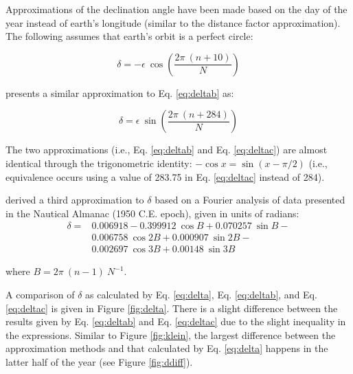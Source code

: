 Approximations of the declination angle have been made based on the day of the year instead of earth's longitude (similar to the distance factor approximation). 
The following assumes that earth's orbit is a perfect circle:

\begin{equation}
\label{eq:deltab}
    \delta = -\epsilon\:\cos\left(\frac{2\pi\:(n+10)}{N} \right)
\end{equation}

\cite{cooper69} presents a similar approximation to Eq. \ref{eq:deltab} as:

\begin{equation}
\label{eq:deltac}
    \delta = \epsilon\:\sin\left(\frac{2\pi\:(n + 284)}{N} \right)
\end{equation}

The two approximations (i.e., Eq. \ref{eq:deltab} and Eq. \ref{eq:deltac}) are almost identical through the trigonometric identity: $-\cos x = \sin(x - \pi/2)$ (i.e., equivalence occurs using a value of 283.75 in Eq. \ref{eq:deltac} instead of 284).

\cite{spencer71} derived a third approximation to $\delta$ based on a Fourier analysis of data presented in the Nautical Almanac (1950 C.E. epoch), given in units of radians:
\begin{equation}
\label{eq:spencer}
\begin{split}
	\delta = & 0.006918 - 0.399912\:\cos B + 0.070257\:\sin B - \\
             & 0.006758 \:\cos 2B + 0.000907\:\sin 2B - \\
             & 0.002697\:\cos 3B + 0.00148 \:\sin 3B
\end{split}
\end{equation} 

\noindent where $B = 2\pi\:\left(n-1\right)\: N^{-1}$.

A comparison of $\delta$ as calculated by Eq. \ref{eq:delta}, Eq. \ref{eq:deltab}, and Eq. \ref{eq:deltac} is given in Figure \ref{fig:delta}. 
There is a slight difference between the results given by Eq. \ref{eq:deltab} and Eq. \ref{eq:deltac} due to the slight inequality in the expressions. 
Similar to Figure \ref{fig:klein}, the largest difference between the approximation methods and that calculated by Eq. \ref{eq:delta} happens in the latter half of the year (see Figure \ref{fig:ddiff}).\\

